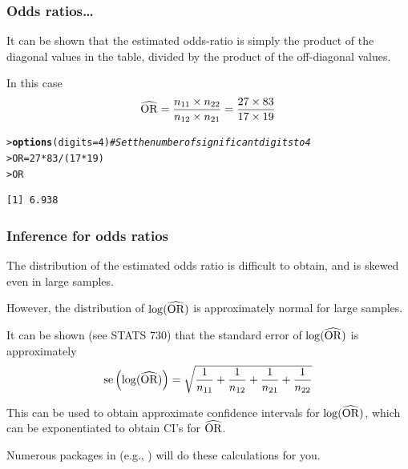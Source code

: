 \documentclass{beamer}\usepackage[]{graphicx}\usepackage[]{xcolor}
\makeatletter
\newcommand{\hlnum}[1]{\textcolor[rgb]{0.686,0.059,0.569}{#1}}%
\newcommand{\hlcom}[1]{\textcolor[rgb]{0.678,0.584,0.686}{\textit{#1}}}%
\newcommand{\hlopt}[1]{\textcolor[rgb]{0,0,0}{#1}}%
\newcommand{\hlstd}[1]{\textcolor[rgb]{0.345,0.345,0.345}{#1}}%
\newcommand{\hlkwb}[1]{\textcolor[rgb]{0.69,0.353,0.396}{#1}}%
\newcommand{\hlkwc}[1]{\textcolor[rgb]{0.333,0.667,0.333}{#1}}%
\newcommand{\hlkwd}[1]{\textcolor[rgb]{0.737,0.353,0.396}{\textbf{#1}}}%
\newenvironment{kframe}{%
 \def\at@end@of@kframe{}%
 \ifinner\ifhmode%
  \def\at@end@of@kframe{\end{minipage}}%
  \begin{minipage}{\columnwidth}%
 \fi\fi%
 \def\FrameCommand##1{\hskip\@totalleftmargin \hskip-\fboxsep
 \colorbox{shadecolor}{##1}\hskip-\fboxsep
     \hskip-\linewidth \hskip-\@totalleftmargin \hskip\columnwidth}%
 \MakeFramed {\advance\hsize-\width
   \@totalleftmargin\z@ \linewidth\hsize
   \@setminipage}}%
 {\par\unskip\endMakeFramed%
 \at@end@of@kframe}
\newenvironment{knitrout}{}{} %
\makeatother
\begin{document}
\begin{frame}[fragile]
\frametitle{Odds ratios\dots}
It can be shown that the estimated odds-ratio is simply the product of the diagonal values in the table, divided by the product of the off-diagonal values.
\medskip

In this case
\[ \widehat{\operatorname{OR}} = \frac{n_{11} \times n_{22}}{n_{12} \times n_{21}} = \frac{27 \times 83}{17 \times 19} \]

\begin{knitrout}\scriptsize
{}\color{fgcolor}\begin{kframe}
\begin{alltt}
\hlstd{> }\hlkwd{options}\hlstd{(}\hlkwc{digits}\hlstd{=}\hlnum{4}\hlstd{)} \hlcom{# Set the number of significant digits to 4}
\hlstd{> }\hlstd{OR}\hlkwb{=}\hlnum{27}\hlopt{*}\hlnum{83}\hlopt{/}\hlstd{(}\hlnum{17}\hlopt{*}\hlnum{19}\hlstd{)}
\hlstd{> }\hlstd{OR}
\end{alltt}
\begin{verbatim}
[1] 6.938
\end{verbatim}
\end{kframe}
\end{knitrout}
\end{frame}


\begin{frame}
\frametitle{Inference for odds ratios}
The distribution of the estimated odds ratio is difficult to obtain,
and is skewed even in large samples.

\medskip

However, the distribution of $\log(\widehat{\operatorname{OR}})$ is approximately normal for large samples.

\medskip

It can be shown (see STATS 730) that the standard error of $\log(\widehat{\operatorname{OR}})$ is approximately
\[ \operatorname{se}\left( \log(\widehat{\operatorname{OR}}) \right)
   = \sqrt{ \frac{1}{n_{11}}+\frac{1}{n_{12}}+\frac{1}{n_{21}}+\frac{1}{n_{22}} } \]
   
This can be used to obtain approximate confidence intervals for $\log(\widehat{\operatorname{OR}})$, which can be exponentiated to obtain CI's for $\widehat{\operatorname{OR}}$.
\medskip

Numerous packages in  (e.g., ) will do these calculations for you.
\end{frame}
\end{document}
